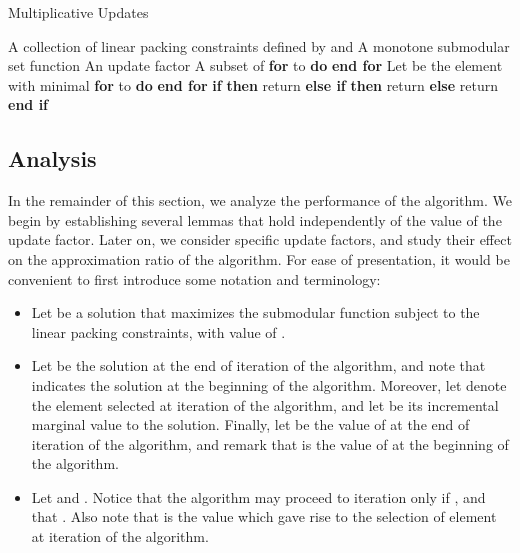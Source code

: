 \documentclass[11pt]{article}
\theoremstyle{plain}
\theoremstyle{definition}
\begin{document}
\begin{algorithm}
\caption{Multiplicative Updates}\label{cap:MultiplicativeUpdates}\begin{algorithmic}[1]
\Require A collection of linear packing constraints defined by  and  \Statex \qquad\; A monotone submodular set function  \Statex \qquad\; An update factor  \Ensure A subset of  \smallskip 
\State  \State \textbf{for}  to  \textbf{do}  \textbf{end for} \smallskip 
{} \label{alg:StopCond} \State Let  be the element with minimal  \State  \State \textbf{for}  to  \textbf{do}  \textbf{end for} \label{alg:WeightUpdate} \EndWhile \smallskip 
\State \textbf{if}  \textbf{then} return  \State \textbf{else if}  \textbf{then} return  \State \textbf{else} return  \textbf{end if} \end{algorithmic}
\end{algorithm}


\subsection{Analysis} \label{subsec:Analysis}
In the remainder of this section, we analyze the performance of
the algorithm. We begin by establishing several lemmas that hold
independently of the value of the update factor. Later on, we
consider specific update factors, and study their effect on the
approximation ratio of the algorithm. For ease of presentation, it
would be convenient to first introduce some notation and
terminology:
\begin{itemize}
\item Let  be a solution that maximizes the
submodular function subject to the linear packing constraints,
with value of .

\item Let  be the solution at the end of iteration  of the
algorithm, and note that  indicates the solution
at the beginning of the algorithm. Moreover, let 
denote the element selected at iteration  of the algorithm, and
let  be its incremental marginal
value to the solution. Finally, let  be the value of 
at the end of iteration  of the algorithm, and remark that
 is the value of  at the beginning of the
algorithm.

\item Let  and . Notice that
the algorithm may proceed to iteration  only if , and that . Also note that 
is the value which gave rise to the selection of element
 at iteration  of the algorithm.
\end{itemize}
\end{document}
